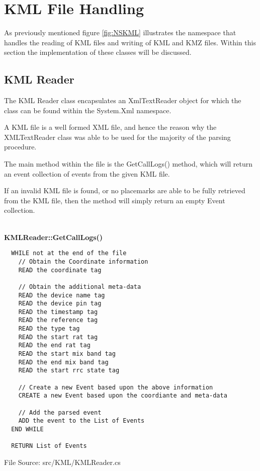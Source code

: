 \section{KML File Handling}

As previously mentioned figure \ref{fig:NSKML} illustrates the namespace that 
handles the reading of KML files and writing of KML and KMZ files. Within this 
section the implementation of these classes will be discussed.

\subsection{KML Reader}
The KML Reader class encapsulates an {\ttfamily XmlTextReader} object for 
which the class can be found within the {\ttfamily System.Xml} namespace. 

A KML file is a well formed XML file, and hence the reason why the 
{\ttfamily XMLTextReader} class was able to be used for the majority of the 
parsing procedure.

The main method within the file is the {\ttfamily GetCallLogs()} method, which
will return an event collection of events from the given KML file. 

If an invalid KML file is found, or no placemarks are able to be fully 
retrieved from the KML file, then the method will simply return an empty Event 
collection.

~\\
{\bfseries KMLReader::GetCallLogs()}
\lstset{style=pseudocode}
\begin{lstlisting}
  WHILE not at the end of the file
    // Obtain the Coordinate information
    READ the coordinate tag

    // Obtain the additional meta-data
    READ the device name tag
    READ the device pin tag
    READ the timestamp tag
    READ the reference tag
    READ the type tag
    READ the start rat tag
    READ the end rat tag
    READ the start mix band tag
    READ the end mix band tag
    READ the start rrc state tag

    // Create a new Event based upon the above information
    CREATE a new Event based upon the coordiante and meta-data

    // Add the parsed event
    ADD the event to the List of Events
  END WHILE

  RETURN List of Events
\end{lstlisting}
{\textsf \footnotesize File Source: src/KML/KMLReader.cs }

